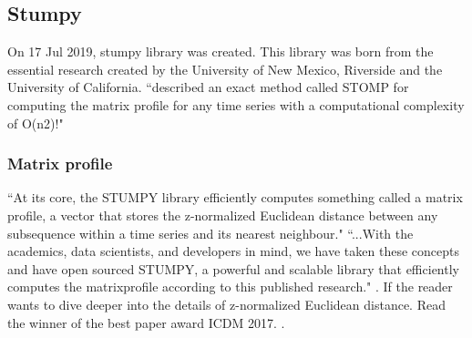 
\subsection{Stumpy}
On 17 Jul 2019, stumpy library was created. This library was born from the essential research created by the  University of New Mexico, Riverside and the University of California. ``described an exact method called STOMP for computing the matrix profile for any time series with a computational complexity of O(n2)!" \cite{law2019stumpy} 

\subsubsection{Matrix profile} ``At its core, the STUMPY library efficiently computes something called a matrix profile, a vector that stores the z-normalized Euclidean distance between any subsequence within a time series and its nearest neighbour." ``...With the academics, data scientists, and developers in mind, we have taken these concepts and have open sourced STUMPY, a powerful and scalable library that efficiently computes the matrixprofile according to this published research." \cite{law2019stumpy}. If the reader wants to dive deeper into the details of z-normalized Euclidean distance. Read the winner of the best paper award ICDM 2017. \cite{zhu_imamura_nikovski_keogh_2017}.

